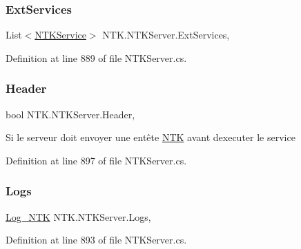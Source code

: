 \subsubsection{\texorpdfstring{ExtServices}{ExtServices}}
{\footnotesize\ttfamily List$<$\mbox{\hyperlink{class_n_t_k_1_1_service_1_1_n_t_k_service}{N\+T\+K\+Service}}$>$ N\+T\+K.\+N\+T\+K\+Server.\+Ext\+Services\hspace{0.3cm}{\ttfamily [get]}, {\ttfamily [set]}}







Definition at line 889 of file N\+T\+K\+Server.\+cs.

\mbox{\label{class_n_t_k_1_1_n_t_k_server_a0f59045464675f975f77bbda6042c390}} 
\subsubsection{\texorpdfstring{Header}{Header}}
{\footnotesize\ttfamily bool N\+T\+K.\+N\+T\+K\+Server.\+Header\hspace{0.3cm}{\ttfamily [get]}, {\ttfamily [set]}}



Si le serveur doit envoyer une entête \mbox{\hyperlink{namespace_n_t_k}{N\+TK}} avant d\textquotesingle{}executer le service 



Definition at line 897 of file N\+T\+K\+Server.\+cs.

\mbox{\label{class_n_t_k_1_1_n_t_k_server_a42f4c64e1d3c4a007696bb013ca1e95c}} 
\subsubsection{\texorpdfstring{Logs}{Logs}}
{\footnotesize\ttfamily \mbox{\hyperlink{class_n_t_k_1_1_other_1_1_log___n_t_k}{Log\+\_\+\+N\+TK}} N\+T\+K.\+N\+T\+K\+Server.\+Logs\hspace{0.3cm}{\ttfamily [get]}, {\ttfamily [set]}}







Definition at line 893 of file N\+T\+K\+Server.\+cs.

